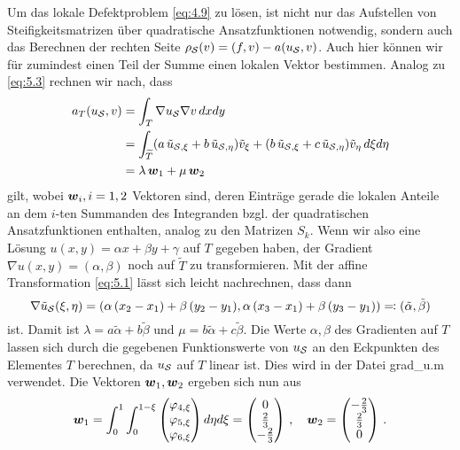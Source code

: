 Um das lokale Defektproblem \eqref{eq:4.9} zu lösen, ist nicht nur das Aufstellen von Steifigkeitsmatrizen über quadratische Ansatzfunktionen notwendig, sondern auch das Berechnen der rechten Seite $\rho_{\mathcal S}(v) = (f,v)-a(u_{\mathcal S},v)$. Auch hier können wir für zumindest einen Teil der Summe einen lokalen Vektor bestimmen. Analog zu \eqref{eq:5.3} rechnen wir nach, dass
\begin{align}\notag
	a_T(u_{\mathcal S},v) & = \int_T \nabla u_{\mathcal S} \nabla v \, dx dy \\
	\notag
	& = \int_{\widetilde T} (a\, \tilde u_{\mathcal S,\xi} + b \, \tilde u_{\mathcal S,\eta})\tilde v_\xi + (b\,  \tilde u_{\mathcal S,\xi}+ c \, \tilde u_{\mathcal S,\eta}) \tilde v_\eta \, d\xi d\eta \\
	\label{eq:5.6}
	& = \lambda \, \boldsymbol w_1 + \mu \, \boldsymbol w_2 
\end{align}
gilt, wobei $\boldsymbol w_i,i = 1,2$ Vektoren sind, deren Einträge gerade die lokalen Anteile an dem $i$-ten Summanden des Integranden bzgl. der quadratischen Ansatzfunktionen enthalten, analog zu den Matrizen $S_k$. Wenn wir also eine Lösung $u(x,y) = \alpha x+\beta y + \gamma$ auf $T$ gegeben haben, der Gradient $\nabla u(x,y) = (\alpha,\beta)$ noch auf $\widetilde T$ zu transformieren. Mit der affine Transformation \eqref{eq:5.1} lässt sich leicht nachrechnen, dass dann
\[
	\nabla \tilde u_{\mathcal S} (\xi,\eta) = (\alpha\, (x_2-x_1)+\beta \, (y_2-y_1), \alpha \, (x_3-x_1) + \beta \, (y_3-y_1)) \eqqcolon (\tilde \alpha, \tilde \beta)
\]
ist. Damit ist $\lambda = a\tilde \alpha + b \tilde\beta$ und $\mu = b \tilde \alpha + c \tilde \beta$. Die Werte $\alpha, \beta$ des Gradienten auf $T$ lassen sich durch die gegebenen Funktionswerte von $u_{\mathcal S}$ an den Eckpunkten des Elementes $T$ berechnen, da $u_{\mathcal S}$ auf $T$ linear ist. Dies wird in der Datei {\ttfamily grad_u.m} verwendet. Die Vektoren $\boldsymbol w_1,\boldsymbol w_2$ ergeben sich nun aus
\[
	\boldsymbol w_1 = \int_0^1\int_0^{1-\xi} \begin{pmatrix}
								\varphi_{4,\xi} \\
								\varphi_{5,\xi} \\
								\varphi_{6,\xi}
							\end{pmatrix} d\eta d\xi =  \begin{pmatrix}
								0 \\
								\frac 23 \\
								-\frac 23
							\end{pmatrix} \, , \quad 
							\boldsymbol w_2 =  \begin{pmatrix}
								-\frac 23 \\
								\frac 23 \\
								0
							\end{pmatrix} \, .
\]
